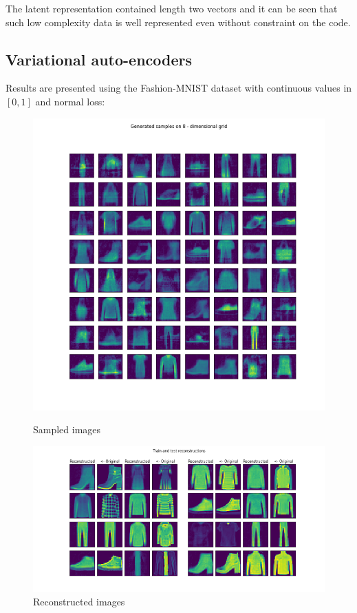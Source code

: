 \documentclass[12pt, english]{article}
\begin{document}
\par The latent representation contained length two vectors and it can be seen that such low complexity data is well represented even without constraint on the code.

\newpage

\subsection{Variational auto-encoders}

\vspace{5mm}

\par Results are presented using the Fashion-MNIST dataset with continuous values in $[0, 1]$ and normal loss:

\vspace{4mm}

\begin{figure}[ht] 
  \label{fig:auto_encoder_results} 
  \begin{minipage}{0.5\linewidth}
    \centering
    \includegraphics[width=.65\linewidth]{gen/generated_samples_fashion_mnist_dense_vae.png} 
    \caption{Sampled images} 
  \end{minipage}%
  \begin{minipage}{0.5\linewidth}
    \centering
    \includegraphics[width=.95\linewidth]{reco/reconstrunction_samples_fashion_mnist_dense_vae.png} 
    \caption{Reconstructed images} 
  \end{minipage} 
\end{figure}
\end{document}
